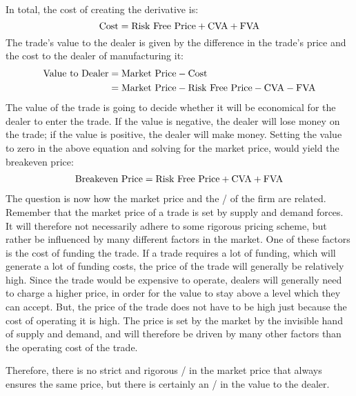 \documentclass[main.tex]{subfiles}
\begin{document}
    In total, the cost of creating the derivative is:
        \begin{equation*}
            \text{Cost} = \text{Risk Free Price} + \CVA/ + \FVA/
        \end{equation*}
    The trade's value to the dealer is given by the difference in the trade's price
    and the cost to the dealer of manufacturing it:
        \begin{align*}
            \text{Value to Dealer} 
            &=
            \text{Market Price}
            -
            \text{Cost} 
            \\
            &= \text{Market Price} - \text{Risk Free Price} - \CVA/ - \FVA/
        \end{align*}
    The value of the trade is going to decide whether it will be economical 
    for the dealer to enter the trade. 
    If the value is negative, the dealer will lose money on the trade;
    if the value is positive, the dealer will make money.
    Setting the value to zero in the above equation and solving for the market price, 
    would yield the breakeven price:
        \begin{align*}
            \text{Breakeven Price}
            =
            \text{Risk Free Price} + \CVA/ + \FVA/
        \end{align*}
    The question is now how the market price and the \FVA/ of the firm are related.
    Remember that the market price of a trade is set by supply and demand forces.
    It will therefore not necessarily adhere to some rigorous pricing scheme,
    but rather be influenced by many different factors in the market.
    One of these factors is the cost of funding the trade.
    If a trade requires a lot of funding, which will generate a lot of funding costs,
    the price of the trade will generally be relatively high.
    Since the trade would be expensive to operate, 
    dealers will generally need to charge a higher price, 
    in order for the value to stay above a level which they can accept.
    But, the price of the trade does not have to be high 
    just because the cost of operating it is high.
    The price is set by the market by the invisible hand of supply and demand,
    and will therefore be driven by many other factors than the operating cost of the trade.
    
    Therefore, there is no strict and rigorous \FVA/ in the market price that always ensures the same price, 
    but there is certainly an \FVA/ in the value to the dealer.
\end{document}
